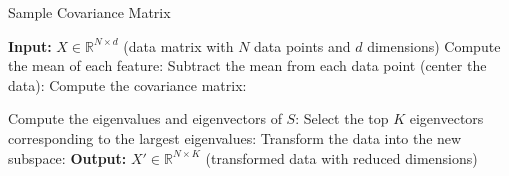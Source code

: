 \documentclass[serif, aspectratio=169]{beamer}
\begin{document}

\begin{frame}{Sample Covariance Matrix}
    \begin{algorithm}[H]
    \caption{Sample Covariance Matrix}\label{alg:Sample Covariance Matrix}
    \begin{algorithmic}[1]
         \State \textbf{Input:} $X \in \mathbb{R}^{N \times d}$ (data matrix with $N$ data points and $d$ dimensions)
        \State Compute the mean of each feature: 
        \State Subtract the mean from each data point (center the data): 
        \State Compute the covariance matrix: 

        \State Compute the eigenvalues and eigenvectors of $S$: 
        \State Select the top $K$ eigenvectors corresponding to the largest eigenvalues: 
        \State Transform the data into the new subspace:
        \State \textbf{Output:} $X' \in \mathbb{R}^{N \times K}$ (transformed data with reduced dimensions)
    \end{algorithmic}
    \end{algorithm}
\end{frame}
\end{document}
